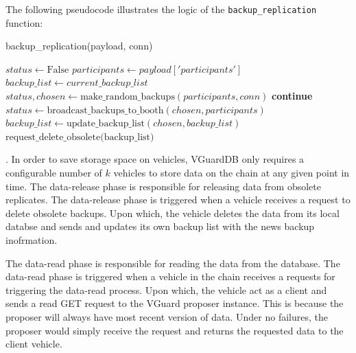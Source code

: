 The following pseudocode illustrates the logic of the \texttt{backup\_replication} function:

\begin{algorithm}[H]
\caption{backup\_replication(payload, conn)}
\begin{algorithmic}
\STATE $status \gets \text{False}$
\STATE $participants \gets payload['participants']$
\STATE $backup\_list \gets current\_backup\_list $
    \STATE $status, chosen \gets \text{make\_random\_backups}(participants, conn)$
        \STATE \textbf{continue}
    \ENDIF
    \STATE $status \gets \text{broadcast\_backups\_to\_booth}(chosen, participants)$
    \STATE $backup\_list \gets \text{update\_backup\_list}(chosen, backup\_list)$
    \STATE $\text{request\_delete\_obsolete(backup\_list)}$
\ENDWHILE
\end{algorithmic}
\end{algorithm}

. In order to save storage space on vehicles, VGuardDB only requires a configurable number of $k$ vehicles to store data on the chain at any given point in time. The data-release phase is responsible for releasing data from obsolete replicates. The data-release phase is triggered when a vehicle receives a request to delete obsolete backups. Upon which, the vehicle deletes the data from its local databse and sends and updates its own backup list with the news backup inofrmation.

The data-read phase is responsible for reading the data from the database. The data-read phase is triggered when a vehicle in the chain receives a requests for triggering the data-read process. Upon which, the vehicle act as a client and sends a read GET request to the VGuard proposer instance. This is because the proposer will always have most recent version of data. Under no failures, the proposer would simply receive the request and returns the requested data to the client vehicle. 

